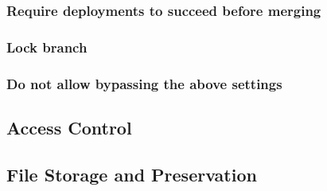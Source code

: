\subsubsection{Require deployments to succeed before merging}



\subsubsection{Lock branch}

\subsubsection{Do not allow bypassing the above settings}


\newpage

\subsection{Access Control}
\subsection{File Storage and Preservation}
